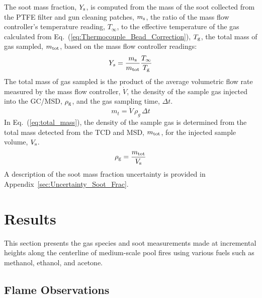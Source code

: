 \documentclass[12pt]{article}
\begin{document}
The soot mass fraction, $Y_{\rm s}$, is computed from the mass of the soot collected from the PTFE filter and gun cleaning patches, $m_{\rm s}$, the ratio of the mass flow controller's temperature reading, $T_{\infty}$, to the effective temperature of the gas calculated from Eq.~(\ref{eq:Thermocouple_Bead_Correction}), $T_{\rm g}$, the total mass of gas sampled, $m_{\rm tot}$, based on the mass flow controller readings:
\begin{equation}\label{eq:soot_mass_frac}
Y_{s}= \frac{m_{\rm s}}{m_{\rm tot}}\frac{T_{\infty}}{T_{\rm g}}
\end{equation}
The total mass of gas sampled is the product of the average volumetric flow rate measured by the mass flow controller, $\dot{V}$, the density of the sample gas injected into the GC/MSD, $\rho_{\rm g}$, and the gas sampling time, $\Delta t$.
\begin{equation}\label{eq:total_mass}
m_{t}= \dot{V} \, \rho_{g}\, \Delta t
\end{equation}
In Eq.~(\ref{eq:total_mass}), the density of the sample gas is determined from the total mass detected from the TCD and MSD, $m_{\rm tot}$, for the injected sample volume, $V_{\rm s}$.
\begin{equation}\label{eq:gas_density}
\rho_{\rm g}= \frac{m_{\rm tot}}{V_{\rm s}}
\end{equation}
A description of the soot mass fraction uncertainty is provided in Appendix~\ref{sec:Uncertainty_Soot_Frac}.




\clearpage

\section{Results}
\label{sec:Results}

This section presents the gas species and soot measurements made at incremental heights along the centerline of medium-scale pool fires using various fuels such as methanol, ethanol, and acetone. 

\subsection{Flame Observations}
\label{ssec:Flame_Observations}
\end{document}
